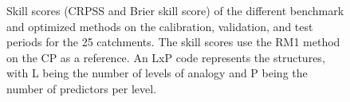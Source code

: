 \documentclass[draft]{agujournal2019}
\begin{document}
\begin{figure}[hbtp]
	\noindent{}
	\caption{Skill scores (CRPSS and Brier skill score) of the different benchmark and optimized methods on the calibration, validation, and test periods for the 25 catchments. The skill scores use the RM1 method on the CP as a reference. An LxP code represents the structures, with L being the number of levels of analogy and P being the number of predictors per level.}
	\label{fig_scores}
\end{figure}
\end{document}
